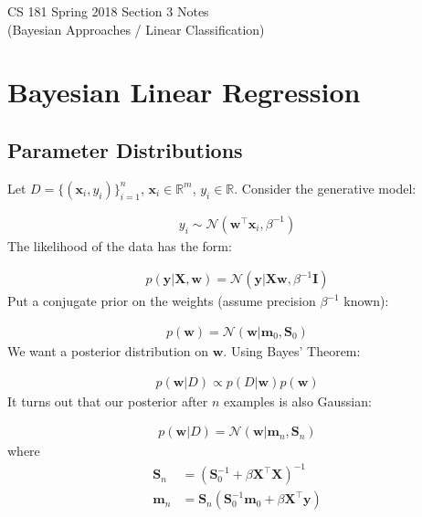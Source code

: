 \documentclass[12pt,letterpaper]{article}
\begin{document}
\begin{center}
CS 181 Spring 2018 Section 3 Notes\\
(Bayesian Approaches / Linear Classification)
\end{center}



\section{Bayesian Linear Regression}

\subsection{Parameter Distributions}

Let $D = \{(\mathbf{x}_i, y_i)\}_{i=1}^n$, $\mathbf{x}_i \in \mathbb{R}^m$, $y_i \in \mathbb{R}$. Consider the generative model:

\begin{align}
y_i \sim \mathcal{N}(\mathbf{w}^\top \mathbf{x}_i, \beta^{-1})
\end{align}
\noindent The likelihood of the data has the form:

\begin{align}
    p(\mathbf{y}|\mathbf{X},\mathbf{w}) = \mathcal{N}(\mathbf{y}|\mathbf{X}\mathbf{w},\beta^{-1}\mathbf{I})
\end{align}
\noindent Put a conjugate prior on the weights (assume precision $\beta^{-1}$ known):

\begin{align}
    p(\mathbf{w}) = \mathcal{N}(\mathbf{w}|\mathbf{m}_0, \mathbf{S}_0)
\end{align}
\noindent We want a posterior distribution on $\mathbf{w}$. Using Bayes' Theorem:

\begin{align}
    p(\mathbf{w}|D) \propto p(D|\mathbf{w})p(\mathbf{w})
\end{align}
\noindent It turns out that our posterior after $n$ examples is also Gaussian:

\begin{align}
    p(\mathbf{w}|D) = \mathcal{N}(\mathbf{w}|\mathbf{m}_n, \mathbf{S}_n)
\end{align}
where
\begin{align}
    \mathbf{S}_n &= \left(\mathbf{S}_0^{-1} + \beta \mathbf{X}^\top\mathbf{X}\right)^{-1}\\
    \mathbf{m}_n &= \mathbf{S}_n(\mathbf{S}_0^{-1}\mathbf{m}_0 + \beta \mathbf{X}^\top\mathbf{y})
\end{align}
\end{document}
